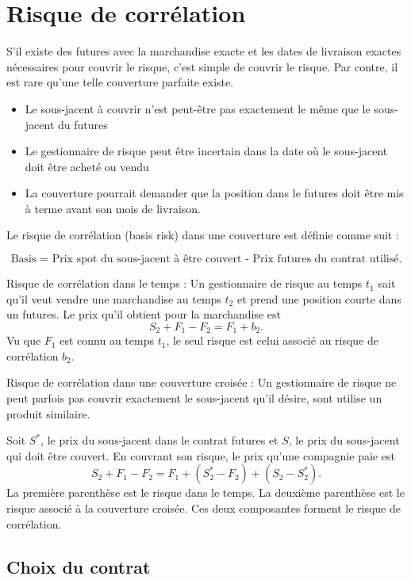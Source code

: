\section{Risque de corrélation}

S'il existe des futures avec la marchandise exacte et les dates de livraison exactes nécessaires pour couvrir le risque, c'est simple de couvrir le risque. Par contre, il est rare qu'une telle couverture parfaite existe. 

\begin{itemize}
	\item Le sous-jacent à couvrir n'est peut-être pas exactement le même que le sous-jacent du futures
	\item Le gestionnaire de risque peut être incertain dans la date où le sous-jacent doit être acheté ou vendu
	\item La couverture pourrait demander que la position dans le futures doit être mis à terme avant son mois de livraison. 
\end{itemize}

Le risque de corrélation (basis risk) dans une couverture est définie comme suit : 

\begin{formule}
	$$\text{Basis = Prix spot du sous-jacent à être couvert - Prix futures du contrat utilisé.}$$
\end{formule}

Risque de corrélation dans le temps : Un gestionnaire de risque au temps $t_1$ sait qu'il veut vendre une marchandise au temps $t_2$ et prend une position courte dans un futures. Le prix qu'il obtient pour la marchandise est 
$$S_2 + F_1 - F_2 = F_1 + b_2.$$ Vu que $F_1$ est connu au temps $t_1$, le seul risque est celui associé au risque de corrélation $b_2$. 

Risque de corrélation dans une couverture croisée : Un gestionnaire de risque ne peut parfois pas couvrir exactement le sous-jacent qu'il désire, sont utilise un produit similaire. 

Soit $S^*$, le prix du sous-jacent dans le contrat futures et $S$, le prix du sous-jacent qui doit être couvert. En couvrant son risque, le prix qu'une compagnie paie est 
$$S_2 + F_1 - F_2 = F_1 + (S_2^* - F_2) + (S_2 - S_2^*).$$ 
La première parenthèse est le risque dans le temps. La deuxième parenthèse est le risque associé à la couverture croisée. Ces deux composantes forment le risque de corrélation. 

\subsection{Choix du contrat}


